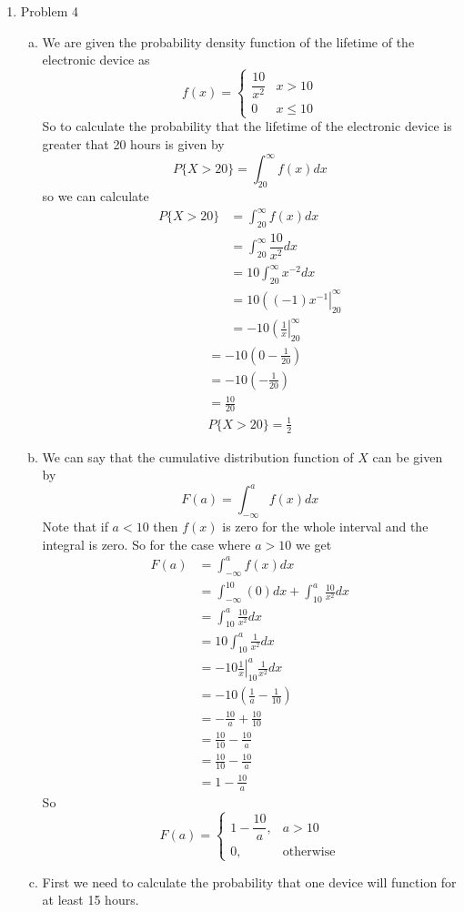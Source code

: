 \documentclass[11pt]{article}
\begin{document}
\begin{enumerate}
\item Problem 4
\begin{enumerate}[(a)]
\item
We are given the probability density function of the lifetime of the electronic device as
$$f(x) = \left\{\begin{array}{lc}
	\dfrac{10}{x^2} &x>10\\
	0		&x\le10	
	\end{array}\right.$$
So to calculate the probability that the lifetime of the electronic device is greater that 20 hours is given by 
$$P\{X>20\} = \int_{20}^{\infty}f(x)dx$$
so we can calculate
\begin{align*}
P\{X>20\} &= \int_{20}^{\infty}f(x)dx\\
&= \int_{20}^{\infty}\dfrac{10}{x^2}dx\\
&= 10\int_{20}^{\infty} x^{-2}dx\\
&= 10\left((-1)x^{-1}\right|_{20}^{\infty} \\
&= -10\left(\frac{1}{x}\right|_{20}^{\infty} 
\end{align*}
\begin{align*}
&= -10\left(0-\frac{1}{20}\right)\\
&= -10\left(-\frac{1}{20}\right)\\
&= \frac{10}{20}\\
&P\{X>20\} = \frac{1}{2}
\end{align*}
\item
We can say that the cumulative distribution function of $X$ can be given by
$$F(a) = \int_{-\infty}^af(x)dx$$ 
Note that if $a<10$ then $f(x)$ is zero for the whole interval and the integral is zero. So for the case where $a>10$ we get
\begin{align*}
F(a) &= \int_{-\infty}^af(x)dx\\ 
&= \int_{-\infty}^10(0)dx + \int_{10}^a\frac{10}{x^2}dx\\ 
&=\int_{10}^a\frac{10}{x^2}dx\\ 
&=10\int_{10}^a\frac{1}{x^2}dx\\ 
&=-10\left.\frac{1}{x}\right|_{10}^a\frac{1}{x^2}dx\\ 
&=-10\left(\frac{1}{a} - \frac{1}{10}\right)\\
&=-\frac{10}{a} + \frac{10}{10}\\
&=\frac{10}{10}-\frac{10}{a} \\
&=\frac{10}{10}-\frac{10}{a} \\
&=1-\frac{10}{a} 
\end{align*}
So 
$$F(a) = \left\{\begin{array}{cc}
		1-\dfrac{10}{a}, &a>10\\
		0, &\mbox{otherwise}
	\end{array}\right.$$
\item
First we need to calculate the probability that one device will function for at least 15 hours.


\end{enumerate}
\end{enumerate}
\end{document}
